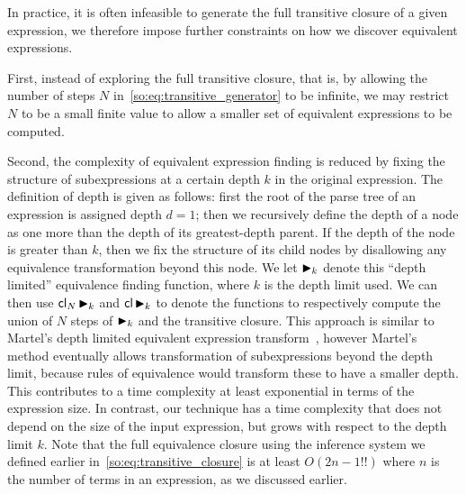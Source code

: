 In practice, it is often infeasible to generate the full transitive closure of
a given expression, we therefore impose further constraints on how we discover
equivalent expressions.

First, instead of exploring the full transitive closure, that is, by allowing
the number of steps $N$ in~\eqref{so:eq:transitive_generator} to be infinite,
we may restrict $N$ to be a small finite value to allow a smaller set of
equivalent expressions to be computed.

Second, the complexity of equivalent expression finding is reduced by fixing
the structure of subexpressions at a certain depth $k$ in the original
expression.  The definition of depth is given as follows: first the root of
the parse tree of an expression is assigned depth $d = 1$; then we recursively
define the depth of a node as one more than the depth of its greatest-depth
parent.  If the depth of the node is greater than $k$, then we fix the
structure of its child nodes by disallowing any equivalence transformation
beyond this node. We let $\operatorname{\blacktriangleright}_k$ denote this ``depth limited'' equivalence
finding function, where $k$ is the depth limit used.  We can then use
$\mathsf{cl}_N \operatorname{\blacktriangleright}_k$ and $\mathsf{cl} \operatorname{\blacktriangleright}_k$ to denote the functions to
respectively compute the union of $N$ steps of $\operatorname{\blacktriangleright}_k$ and the transitive
closure. This approach is similar to Martel's depth limited equivalent
expression transform~\cite{martel07}, however Martel's method eventually allows
transformation of subexpressions beyond the depth limit, because rules of
equivalence would transform these to have a smaller depth.  This contributes
to a time complexity at least exponential in terms of the expression size. In
contrast, our technique has a time complexity that does not depend on the size
of the input expression, but grows with respect to the depth limit $k$. Note
that the full equivalence closure using the inference system we defined earlier
in~\eqref{so:eq:transitive_closure} is at least $O({2n - 1}!!)$ where $n$ is
the number of terms in an expression, as we discussed earlier.

